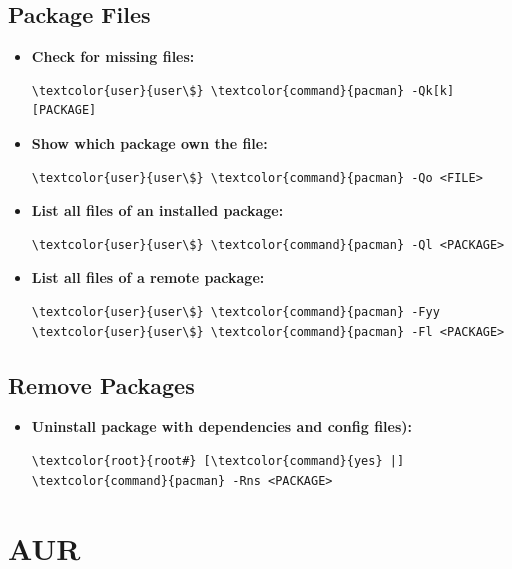 \documentclass[10pt, a4paper, onecolumn, oneside, titlepage, openany]{book}
\begin{document}
\section{Package Files}
\begin{itemize}
    \item \textbf{Check for missing files:}
\begin{Verbatim}[commandchars=\\\{\}]
\textcolor{user}{user\$} \textcolor{command}{pacman} -Qk[k] [PACKAGE]
\end{Verbatim}
    \item \textbf{Show which package own the file:}
\begin{Verbatim}[commandchars=\\\{\}]
\textcolor{user}{user\$} \textcolor{command}{pacman} -Qo <FILE>
\end{Verbatim}
    \item \textbf{List all files of an installed package:}
\begin{Verbatim}[commandchars=\\\{\}]
\textcolor{user}{user\$} \textcolor{command}{pacman} -Ql <PACKAGE>
\end{Verbatim}
    \item \textbf{List all files of a remote package:}
\begin{Verbatim}[commandchars=\\\{\}]
\textcolor{user}{user\$} \textcolor{command}{pacman} -Fyy
\textcolor{user}{user\$} \textcolor{command}{pacman} -Fl <PACKAGE>
\end{Verbatim}
\end{itemize}

\section{Remove Packages}
\begin{itemize}
    \item \textbf{Uninstall package with dependencies and config files):}
\begin{Verbatim}[commandchars=\\\{\}]
\textcolor{root}{root#} [\textcolor{command}{yes} |] \textcolor{command}{pacman} -Rns <PACKAGE>
\end{Verbatim}
\end{itemize}


\chapter{AUR}
\label{AUR}
\end{document}
